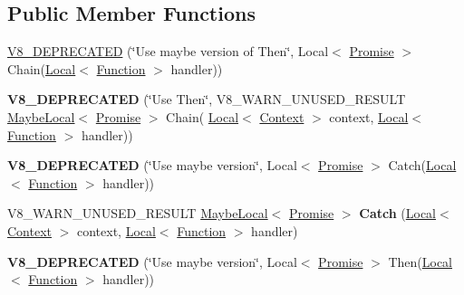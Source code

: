\subsection*{Public Member Functions}
\begin{DoxyCompactItemize}
\item 
\hyperlink{classv8_1_1_promise_a8378226f7b9e986184742dc5bb3cc78b}{V8\+\_\+\+D\+E\+P\+R\+E\+C\+A\+T\+ED} (\char`\"{}Use maybe version of Then\char`\"{}, Local$<$ \hyperlink{classv8_1_1_promise}{Promise} $>$ Chain(\hyperlink{classv8_1_1_local}{Local}$<$ \hyperlink{classv8_1_1_function}{Function} $>$ handler))
\item 
{\bfseries V8\+\_\+\+D\+E\+P\+R\+E\+C\+A\+T\+ED} (\char`\"{}Use Then\char`\"{}, V8\+\_\+\+W\+A\+R\+N\+\_\+\+U\+N\+U\+S\+E\+D\+\_\+\+R\+E\+S\+U\+LT \hyperlink{classv8_1_1_maybe_local}{Maybe\+Local}$<$ \hyperlink{classv8_1_1_promise}{Promise} $>$ Chain(                                                                       \hyperlink{classv8_1_1_local}{Local}$<$ \hyperlink{classv8_1_1_context}{Context} $>$ context, \hyperlink{classv8_1_1_local}{Local}$<$ \hyperlink{classv8_1_1_function}{Function} $>$ handler))\hypertarget{classv8_1_1_promise_a6a144ca5339ce1ccf856b4c142a9ff3e}{}\label{classv8_1_1_promise_a6a144ca5339ce1ccf856b4c142a9ff3e}

\item 
{\bfseries V8\+\_\+\+D\+E\+P\+R\+E\+C\+A\+T\+ED} (\char`\"{}Use maybe version\char`\"{}, Local$<$ \hyperlink{classv8_1_1_promise}{Promise} $>$ Catch(\hyperlink{classv8_1_1_local}{Local}$<$ \hyperlink{classv8_1_1_function}{Function} $>$ handler))\hypertarget{classv8_1_1_promise_abac3f6124a1393b13500f2579bd28513}{}\label{classv8_1_1_promise_abac3f6124a1393b13500f2579bd28513}

\item 
V8\+\_\+\+W\+A\+R\+N\+\_\+\+U\+N\+U\+S\+E\+D\+\_\+\+R\+E\+S\+U\+LT \hyperlink{classv8_1_1_maybe_local}{Maybe\+Local}$<$ \hyperlink{classv8_1_1_promise}{Promise} $>$ {\bfseries Catch} (\hyperlink{classv8_1_1_local}{Local}$<$ \hyperlink{classv8_1_1_context}{Context} $>$ context, \hyperlink{classv8_1_1_local}{Local}$<$ \hyperlink{classv8_1_1_function}{Function} $>$ handler)\hypertarget{classv8_1_1_promise_ab5b9bc0140b750cbf569f3a0e6c92b42}{}\label{classv8_1_1_promise_ab5b9bc0140b750cbf569f3a0e6c92b42}

\item 
{\bfseries V8\+\_\+\+D\+E\+P\+R\+E\+C\+A\+T\+ED} (\char`\"{}Use maybe version\char`\"{}, Local$<$ \hyperlink{classv8_1_1_promise}{Promise} $>$ Then(\hyperlink{classv8_1_1_local}{Local}$<$ \hyperlink{classv8_1_1_function}{Function} $>$ handler))\hypertarget{classv8_1_1_promise_a9bb6f0ee5815b09a9ad25b1f263a471c}{}\label{classv8_1_1_promise_a9bb6f0ee5815b09a9ad25b1f263a471c}


\end{DoxyCompactItemize}

